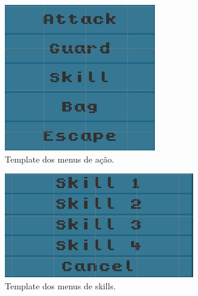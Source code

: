 \begin{figure}[h!]
  \centering
  \begin{subfigure}[b]{0.25\linewidth}
    \includegraphics[width=\linewidth]{menutemplate.jpg}
     \caption{Template dos menus de ação.}
  \end{subfigure}
  \begin{subfigure}[b]{0.35\linewidth}
    \includegraphics[width=\linewidth]{skilltemplate.jpg}
    \caption{Template dos menus de skills.}
  \end{subfigure}
  \begin{subfigure}[b]{0.35\linewidth}

\end{subfigure}
\end{figure}
